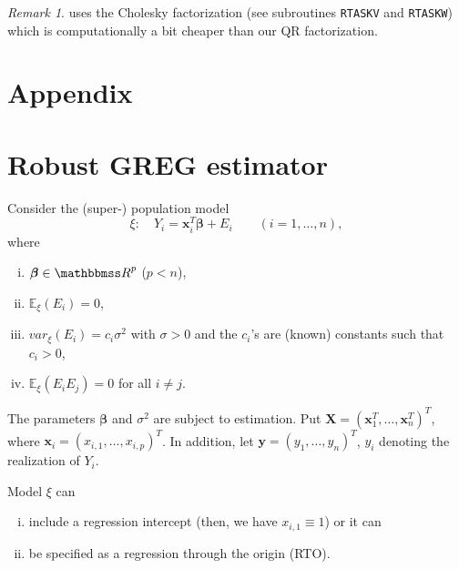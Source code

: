 \documentclass[a4paper,oneside,11pt,DIV=12]{scrartcl}
\newcommand{\R}{{\mathbbmss R}}         %
\newcommand{\code}[1]{{\texttt{#1}}}    %
\theoremstyle{remark}
\newtheorem*{remark}{Remark}
\begin{document}
\begin{remark}
\citet{marazzi_1987} uses the Cholesky factorization (see subroutines \code{RTASKV} and \code{RTASKW}) which is computationally a bit cheaper than our QR factorization.
\end{remark}


{
\singlespacing


}


\appendix
\section{Appendix}

\section{Robust GREG estimator}\label{ch:greg}
Consider the (super-) population model
\begin{equation*}
   \xi: \quad Y_i = \bm x_i^T\bm \beta + E_i \qquad(i=1,\ldots, n),
\end{equation*}
\noindent where 
\begin{enumerate}[i)]
   \item $\bm \beta \in \R^p$ ($p < n$),
   \item $\mathbb{E}_{\xi}(E_i)=0$,  
   \item $var_{\xi}(E_i) = c_i \sigma^2$ with $\sigma > 0$ and the $c_i$'s are (known) constants such that $c_i > 0$,
   \item $\mathbb{E}_{\xi}(E_iE_j)=0$ for all $i \neq j$. 
\end{enumerate}

\noindent The parameters $\bm \beta$ and $\sigma^2$ are subject to estimation. Put $\bm X = (\bm x_1^T, \ldots, \bm x_n^T)^T$, where $\bm x_i = (x_{i,1}, \ldots, x_{i,p})^T$. In addition, let $\bm y = (y_1, \ldots, y_n)^T$, $y_i$ denoting the realization of $Y_i$. 

Model $\xi$ can 
\begin{enumerate}[i)]
   \item include a regression intercept (then, we have $x_{i,1} \equiv 1$)  or it can 
   \item be specified as a regression through the origin (RTO).  
\end{enumerate}
\end{document}
